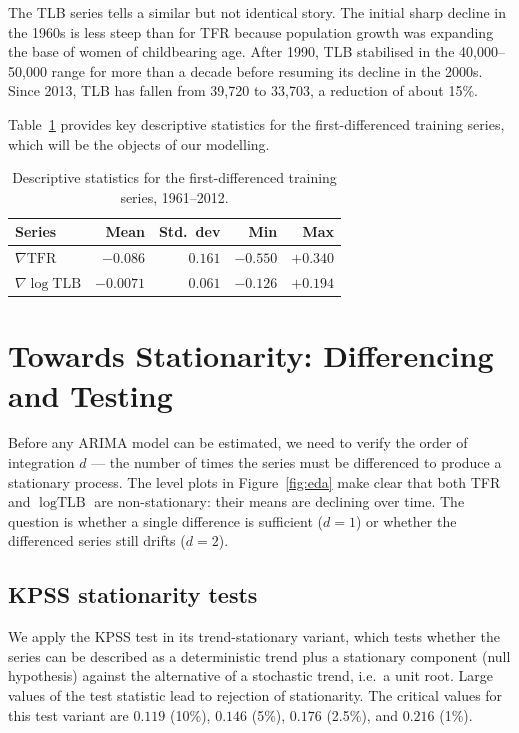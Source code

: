 \documentclass[12pt,a4paper]{article}
\begin{document}
The TLB series tells a similar but not identical story. The initial sharp decline in the
1960s is less steep than for TFR because population growth was expanding the base of
women of childbearing age. After 1990, TLB stabilised in the 40{,}000--50{,}000 range
for more than a decade before resuming its decline in the 2000s. Since 2013, TLB has
fallen from 39{,}720 to 33{,}703, a reduction of about 15\%.

Table~\ref{tab:desc} provides key descriptive statistics for the first-differenced
training series, which will be the objects of our modelling.

\begin{table}[H]
\centering
\caption{Descriptive statistics for the first-differenced training series, 1961--2012.}
\label{tab:desc}
\begin{tabular}{lrrrr}
\toprule
Series & Mean & Std.\ dev & Min & Max \\
\midrule
$\nabla\text{TFR}$ & $-0.086$ & $0.161$ & $-0.550$ & $+0.340$ \\
$\nabla\log\text{TLB}$ & $-0.0071$ & $0.061$ & $-0.126$ & $+0.194$ \\
\bottomrule
\end{tabular}
\end{table}

\section{Towards Stationarity: Differencing and Testing}
\label{sec:stat}

Before any ARIMA model can be estimated, we need to verify the order of
integration $d$ --- the number of times the series must be differenced to produce
a stationary process. The level plots in Figure~\ref{fig:eda} make clear that both
TFR and $\log\text{TLB}$ are non-stationary: their means are declining over time.
The question is whether a single difference is sufficient ($d=1$) or whether the
differenced series still drifts ($d=2$).

\subsection{KPSS stationarity tests}

We apply the KPSS test \citep{kwiatkowski1992} in its trend-stationary variant,
which tests whether the series can be described as a deterministic trend plus a
stationary component (null hypothesis) against the alternative of a stochastic trend,
i.e.\ a unit root. Large values of the test statistic lead to rejection of stationarity.
The critical values for this test variant are $0.119$ (10\%), $0.146$ (5\%),
$0.176$ (2.5\%), and $0.216$ (1\%).
\end{document}
